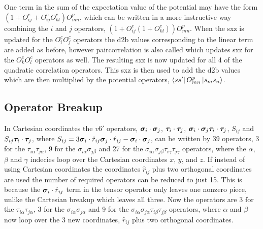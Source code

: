 One term in the sum of the expectation value of the potential may have the form $\left(1+O^c_{ij}+O^c_{ij}O^c_{kl}\right)O^p_{mn}$, which can be written in a more instructive way combining the $i$ and $j$ operators, $\left(1+O^c_{ij}\left(1+O^c_{kl}\right)\right)O^p_{mn}$. When the sxz is updated for the $O^c_iO^c_j$ operators the d2b values corresponding to the linear term are added as before, however paircorrelation is also called which updates sxz for the $O^c_kO^c_l$ operators as well. The resulting sxz is now updated for all 4 of the quadratic correlation operators. This sxz is then used to add the d2b values which are then multiplied by the potential operators, $\left< ss' \right|O^p_{mn}\left| s_ms_n \right>$.

\subsection{Operator Breakup}
In Cartesian coordinates the $v6'$ operators, $\bm{\sigma}_i\cdot\bm{\sigma}_j$, $\bm{\tau}_i\cdot\bm{\tau}_j$, $\bm{\sigma}_i\cdot\bm{\sigma}_j \bm{\tau}_i\cdot\bm{\tau}_j$, $S_{ij}$ and $S_{ij} \bm{\tau}_i\cdot\bm{\tau}_j$, where $S_{ij} = 3\bm{\sigma}_i\cdot\hat{r}_{ij}\bm{\sigma}_j\cdot\hat{r}_{ij}-\bm{\sigma}_i\cdot\bm{\sigma}_j$, can be written by 39 operators, 3 for the $\tau_{i\alpha}\tau_{j\alpha}$, 9 for the $\sigma_{i\alpha}\sigma_{j\beta}$ and 27 for the $\sigma_{i\alpha}\sigma_{j\beta}\tau_{i\gamma}\tau_{j\gamma}$ operators, where the $\alpha$, $\beta$ and $\gamma$ indecies loop over the Cartesian coordinates $x$, $y$, and $z$. If instead of using Cartesian coordinates the coordinates $\hat{r}_{ij}$ plus two orthogonal coordinates are used the number of required operators can be reduced to just 15. This is because the $\bm{\sigma}_i\cdot\hat{r}_{ij}$ term in the tensor operator only leaves one nonzero piece, unlike the Cartesian breakup which leaves all three. Now the operators are 3 for the $\tau_{i\alpha}\tau_{j\alpha}$, 3 for the $\sigma_{i\alpha}\sigma_{j\alpha}$ and 9 for the $\sigma_{i\alpha}\sigma_{j\alpha}\tau_{i\beta}\tau_{j\beta}$ operators, where $\alpha$ and $\beta$ now loop over the 3 new coordinates, $\hat{r}_{ij}$ plus two orthogonal coordinates.
